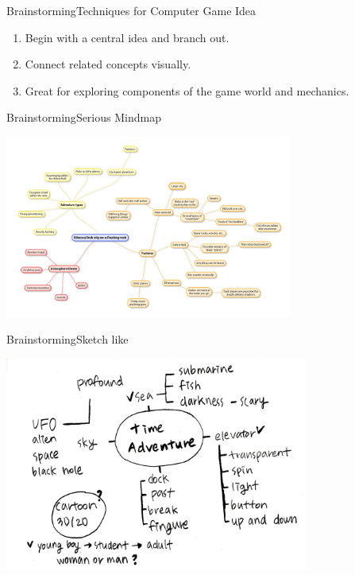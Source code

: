 \documentclass[10pt]{beamer}
\begin{document}

\begin{frame}{Brainstorming}{Techniques for Computer Game Idea}
  \begin{enumerate}
  	\item Begin with a central idea and branch out.
	\item Connect related concepts visually.
	\item Great for exploring components of the game world and mechanics.
    \end{enumerate}
\end{frame}


\begin{frame}{Brainstorming}{Serious Mindmap}
\begin{center}
\includegraphics[height=6cm]{images/mindmap}
\end{center}
\end{frame}


\begin{frame}{Brainstorming}{Sketch like}
\begin{center}
\includegraphics[height=7cm]{images/mindmap2}
\end{center}
\end{frame}
\end{document}
